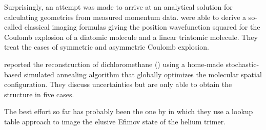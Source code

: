 Surprisingly, an attempt was made to arrive at an analytical solution for calculating geometries from measured momentum data. \citet{Nagaya04} were able to derive a so-called classical imaging formulas giving the position wavefunction squared for the Coulomb explosion of a diatomic molecule and a linear triatomic molecule\footnotemark. They treat the cases of symmetric and asymmetric Coulomb explosion.


\citet{Gagnon08} reported the reconstruction of dichloromethane () using a home-made \footnotemark stochastic-based simulated annealing algorithm that globally optimizes the molecular spatial configuration. They discuss uncertainties but are only able to obtain the structure in five cases.


The best effort so far has probably been the one by \citet{Kunitski15} in which they use a lookup table approach to image the elusive Efimov state of the helium trimer.